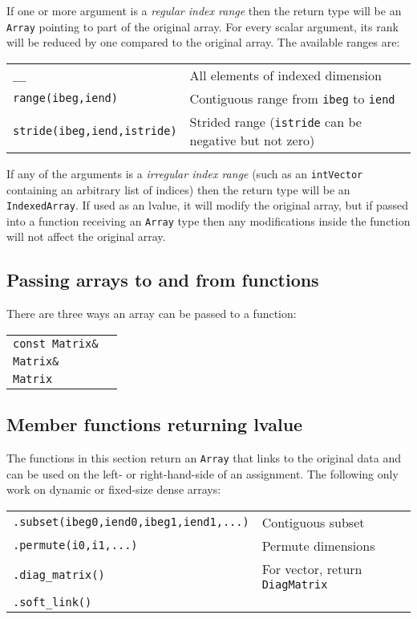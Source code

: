 \documentclass[10pt,a4,landscape]{article}
\def\code#1{\texttt{#1}}
\begin{document}
If one or more argument is a \textit{regular index range} then the return
type will be an \code{Array} pointing to part of the original
array. For every scalar argument, its rank will be reduced by one
compared to the original array. The available ranges are:\\
\begin{tabular}{ll}
\code{\_\_} & All elements of indexed dimension \\
\code{range(ibeg,iend)} & Contiguous range from \code{ibeg} to \code{iend}\\
\code{stride(ibeg,iend,istride)} & Strided range (\code{istride} can be negative but not zero)\\
\end{tabular}

If any of the arguments is a \textit{irregular index range} (such as
an \code{intVector} containing an arbitrary list of indices) then the
return type will be an \code{IndexedArray}. If used as an lvalue, it
will modify the original array, but if passed into a function
receiving an \code{Array} type then any modifications inside the
function will not affect the original array.
\subsection*{Passing arrays to and from functions}
There are three ways an array can be passed to a function:\\
\begin{tabular}{ll}
\code{const Matrix\&} \\
\code{Matrix\&} \\
\code{Matrix}
\end{tabular}

\subsection*{Member functions returning lvalue}
The functions in this section return an \code{Array} that links to the
original data and can be used on the left- or right-hand-side of an
assignment. The following only work on dynamic or fixed-size dense
arrays:\\
\begin{tabular}{ll}
\code{.subset(ibeg0,iend0,ibeg1,iend1,...)} & Contiguous subset\\
\code{.permute(i0,i1,...)} & Permute dimensions\\
\code{.diag\_matrix()} & For vector, return \code{DiagMatrix}\\
\code{.soft\_link()} \\
\end{tabular}
\end{document}
